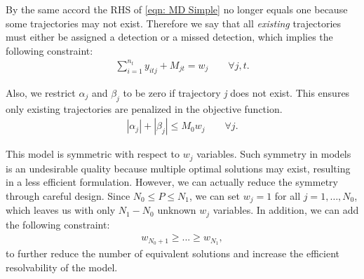 By the same accord the RHS of \eqref{eqn: MD Simple} no longer equals one because some trajectories may not exist. Therefore we say that all \textit{existing} trajectories must either be assigned a detection or a missed detection, which implies the following constraint:
\begin{align}\label{eqn: Existing Targets}
\sum_{i=1}^{n_{t}} y_{itj} + M_{jt} = w_{j} \qquad \forall j,t.
\end{align}

Also, we restrict $\alpha_{j}$ and $\beta_{j}$ to be zero if trajectory \textit{j} does not exist. This ensures only existing trajectories are penalized in the objective function. 
\begin{align*}
|\alpha_{j}|+|\beta_{j}| \leq M_{0}w_{j}\qquad \forall j.
\end{align*}

This model is symmetric with respect to $w_j$ variables. Such symmetry in models is an undesirable quality because multiple optimal solutions may exist, resulting in a less efficient formulation. However, we can actually reduce the symmetry through careful design. Since $N_{0} \leq P \leq N_{1}$, we can set $w_j=1$ for all $j=1,\ldots,N_0$, which leaves us with only $N_1-N_0$ unknown $w_{j}$ variables. In addition, we can add the following constraint:
\begin{align*}
w_{N_0+1}\geq ...\geq w_{N_1},
\end{align*}
to further reduce the number of equivalent solutions and increase the efficient resolvability of the model. 

